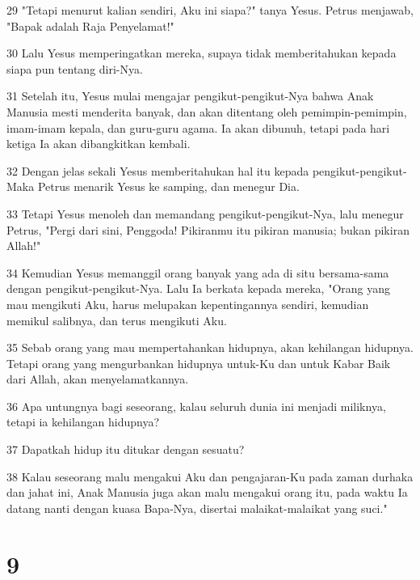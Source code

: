 \par 29 "Tetapi menurut kalian sendiri, Aku ini siapa?" tanya Yesus. Petrus menjawab, "Bapak adalah Raja Penyelamat!"
\par 30 Lalu Yesus memperingatkan mereka, supaya tidak memberitahukan kepada siapa pun tentang diri-Nya.
\par 31 Setelah itu, Yesus mulai mengajar pengikut-pengikut-Nya bahwa Anak Manusia mesti menderita banyak, dan akan ditentang oleh pemimpin-pemimpin, imam-imam kepala, dan guru-guru agama. Ia akan dibunuh, tetapi pada hari ketiga Ia akan dibangkitkan kembali.
\par 32 Dengan jelas sekali Yesus memberitahukan hal itu kepada pengikut-pengikut-Maka Petrus menarik Yesus ke samping, dan menegur Dia.
\par 33 Tetapi Yesus menoleh dan memandang pengikut-pengikut-Nya, lalu menegur Petrus, "Pergi dari sini, Penggoda! Pikiranmu itu pikiran manusia; bukan pikiran Allah!"
\par 34 Kemudian Yesus memanggil orang banyak yang ada di situ bersama-sama dengan pengikut-pengikut-Nya. Lalu Ia berkata kepada mereka, "Orang yang mau mengikuti Aku, harus melupakan kepentingannya sendiri, kemudian memikul salibnya, dan terus mengikuti Aku.
\par 35 Sebab orang yang mau mempertahankan hidupnya, akan kehilangan hidupnya. Tetapi orang yang mengurbankan hidupnya untuk-Ku dan untuk Kabar Baik dari Allah, akan menyelamatkannya.
\par 36 Apa untungnya bagi seseorang, kalau seluruh dunia ini menjadi miliknya, tetapi ia kehilangan hidupnya?
\par 37 Dapatkah hidup itu ditukar dengan sesuatu?
\par 38 Kalau seseorang malu mengakui Aku dan pengajaran-Ku pada zaman durhaka dan jahat ini, Anak Manusia juga akan malu mengakui orang itu, pada waktu Ia datang nanti dengan kuasa Bapa-Nya, disertai malaikat-malaikat yang suci."

\chapter{9}

